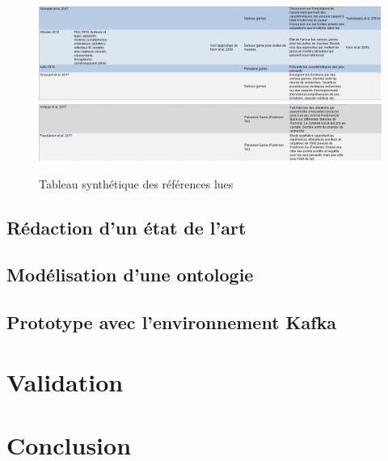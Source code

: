 \documentclass{article}
\begin{document}
\begin{figure}
			\includegraphics[scale=0.47]{include/tri7.PNG}
			\includegraphics[scale=0.47]{include/tri8.PNG}
			\caption{Tableau synthétique des références lues}
			\label{fig:tabsynt}
		\end{figure}

	\subsection{Rédaction d'un état de l'art}
	\subsection{Modélisation d'une ontologie}
	\subsection{Prototype avec l'environnement Kafka}

\section{Validation}

\section{Conclusion}


\newpage
\appendix
\end{document}
